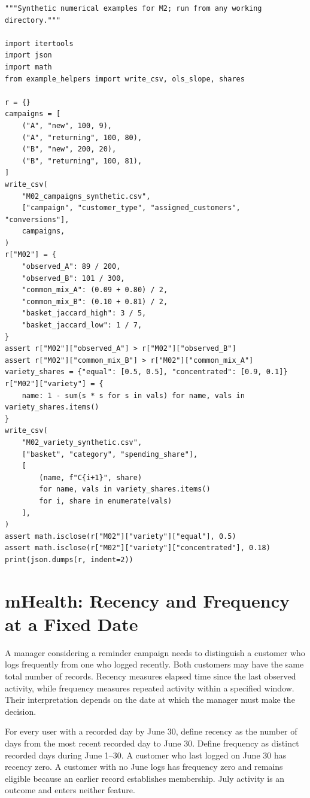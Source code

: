 \begin{Verbatim}[breaklines,breakanywhere,fontsize=\small]
"""Synthetic numerical examples for M2; run from any working directory."""

import itertools
import json
import math
from example_helpers import write_csv, ols_slope, shares

r = {}
campaigns = [
    ("A", "new", 100, 9),
    ("A", "returning", 100, 80),
    ("B", "new", 200, 20),
    ("B", "returning", 100, 81),
]
write_csv(
    "M02_campaigns_synthetic.csv",
    ["campaign", "customer_type", "assigned_customers", "conversions"],
    campaigns,
)
r["M02"] = {
    "observed_A": 89 / 200,
    "observed_B": 101 / 300,
    "common_mix_A": (0.09 + 0.80) / 2,
    "common_mix_B": (0.10 + 0.81) / 2,
    "basket_jaccard_high": 3 / 5,
    "basket_jaccard_low": 1 / 7,
}
assert r["M02"]["observed_A"] > r["M02"]["observed_B"]
assert r["M02"]["common_mix_B"] > r["M02"]["common_mix_A"]
variety_shares = {"equal": [0.5, 0.5], "concentrated": [0.9, 0.1]}
r["M02"]["variety"] = {
    name: 1 - sum(s * s for s in vals) for name, vals in variety_shares.items()
}
write_csv(
    "M02_variety_synthetic.csv",
    ["basket", "category", "spending_share"],
    [
        (name, f"C{i+1}", share)
        for name, vals in variety_shares.items()
        for i, share in enumerate(vals)
    ],
)
assert math.isclose(r["M02"]["variety"]["equal"], 0.5)
assert math.isclose(r["M02"]["variety"]["concentrated"], 0.18)
print(json.dumps(r, indent=2))
\end{Verbatim}

\hypertarget{M02-mhealth-recency-and-frequency-at-a-fixed-date}{%
\section{mHealth: Recency and Frequency at a Fixed
Date}\label{M02-mhealth-recency-and-frequency-at-a-fixed-date}}

\noindent A manager considering a reminder campaign needs to distinguish a
customer who logs frequently from one who logged recently. Both
customers may have the same total number of records. Recency measures
elapsed time since the last observed activity, while frequency measures
repeated activity within a specified window. Their interpretation
depends on the date at which the manager must make the decision.

For every user with a recorded day by June 30, define recency as the
number of days from the most recent recorded day to June 30. Define
frequency as distinct recorded days during June 1--30. A customer who
last logged on June 30 has recency zero. A customer with no June logs
has frequency zero and remains eligible because an earlier record
establishes membership. July activity is an outcome and enters neither
feature.

